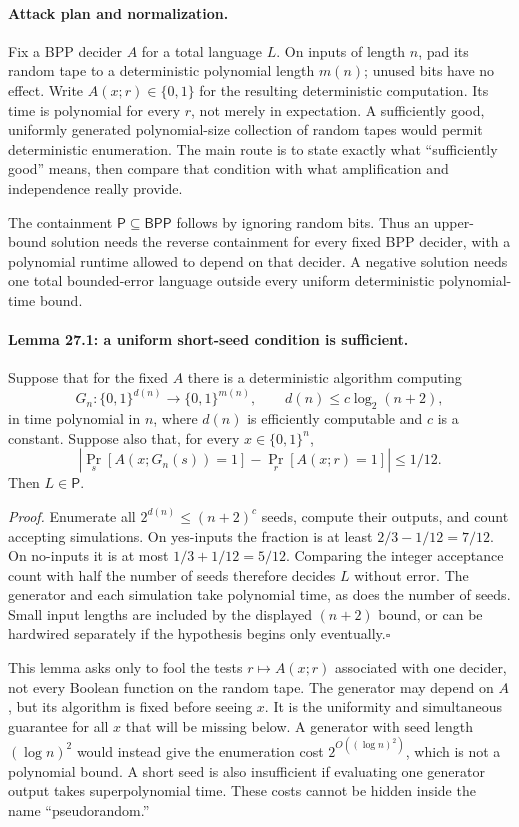 \documentclass[11pt]{article}
\begin{document}
\paragraph{Attack plan and normalization.}
Fix a BPP decider $A$ for a total language $L$. On inputs of length $n$, pad
its random tape to a deterministic polynomial length $m(n)$; unused bits
have no effect. Write $A(x;r)\in\{0,1\}$ for the resulting deterministic
computation. Its time is polynomial for every $r$, not merely in expectation.
A sufficiently good, uniformly generated polynomial-size collection of
random tapes would permit deterministic enumeration. The main route is to
state exactly what ``sufficiently good'' means, then compare that condition
with what amplification and independence really provide.

The containment $\mathsf P\subseteq\mathsf{BPP}$ follows by ignoring random
bits. Thus an upper-bound solution needs the reverse containment for every
fixed BPP decider, with a polynomial runtime allowed to depend on that decider.
A negative solution needs one total bounded-error language outside every
uniform deterministic polynomial-time bound.

\paragraph{Lemma 27.1: a uniform short-seed condition is sufficient.}
Suppose that for the fixed $A$ there is a deterministic algorithm computing
\[
 G_n:\{0,1\}^{d(n)}\longrightarrow\{0,1\}^{m(n)},
 \qquad d(n)\le c\log_2(n+2),
\]
in time polynomial in $n$, where $d(n)$ is efficiently computable and $c$
is a constant. Suppose also that, for every $x\in\{0,1\}^n$,
\begin{equation}\label{a27:fooling}
 \left|\Pr_{s}[A(x;G_n(s))=1]-\Pr_r[A(x;r)=1]\right|\le1/12.
\end{equation}
Then $L\in\mathsf P$.

\emph{Proof.} Enumerate all $2^{d(n)}\le(n+2)^c$ seeds, compute their
outputs, and count accepting simulations. On yes-inputs the fraction is
at least $2/3-1/12=7/12$. On no-inputs it is at most
$1/3+1/12=5/12$. Comparing the integer acceptance count with half the number
of seeds therefore decides $L$ without error. The generator and each
simulation take polynomial time, as does the number of seeds. Small input
lengths are included by the displayed $(n+2)$ bound, or can be hardwired
separately if the hypothesis begins only eventually.\hfill$\square$

This lemma asks only to fool the tests $r\mapsto A(x;r)$ associated with one
decider, not every Boolean function on the random tape. The generator may
depend on $A$, but its algorithm is fixed before seeing $x$. It is the
uniformity and simultaneous guarantee for all $x$ that will be missing below.
A generator with seed length $(\log n)^2$ would instead give the enumeration
cost $2^{O((\log n)^2)}$, which is not a polynomial bound. A short seed is
also insufficient if evaluating one generator output takes superpolynomial
time. These costs cannot be hidden inside the name ``pseudorandom.''
\end{document}
